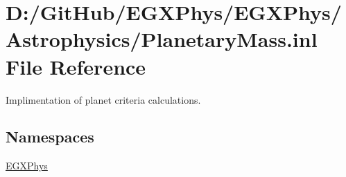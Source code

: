 \hypertarget{_planetary_mass_8inl}{}\section{D\+:/\+Git\+Hub/\+E\+G\+X\+Phys/\+E\+G\+X\+Phys/\+Astrophysics/\+Planetary\+Mass.inl File Reference}
\label{_planetary_mass_8inl}


Implimentation of planet criteria calculations.  


\subsection*{Namespaces}
\begin{DoxyCompactItemize}
\item 
 \mbox{\hyperlink{namespace_e_g_x_phys}{E\+G\+X\+Phys}}
\end{DoxyCompactItemize}
